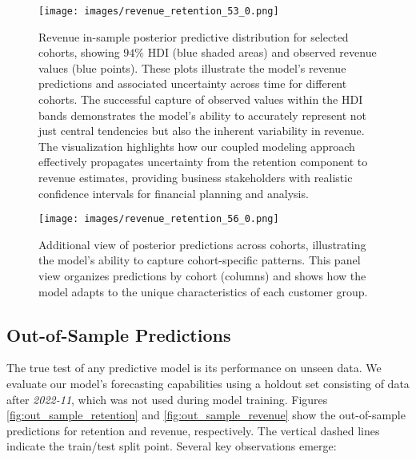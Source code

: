 \documentclass[11pt]{amsart}
\theoremstyle{definition}
\begin{document}
\begin{figure}
    \centering
    \texttt{[image: images/revenue\_retention\_53\_0.png]}
    \caption{Revenue in-sample posterior predictive distribution for selected cohorts, showing $94\%$ HDI (blue shaded areas)
        and observed revenue values (blue points). These plots illustrate the model's revenue predictions and associated
        uncertainty across time for different cohorts. The successful capture of observed values within the HDI bands
        demonstrates the model's ability to accurately represent not just central tendencies but also the inherent
        variability in revenue. The visualization highlights how our coupled modeling approach effectively propagates
        uncertainty from the retention component to revenue estimates, providing business stakeholders with realistic
        confidence intervals for financial planning and analysis.}
    \label{fig:in_sample_revenue}
\end{figure}

\begin{figure}
    \texttt{[image: images/revenue\_retention\_56\_0.png]}
    \caption{Additional view of posterior predictions across cohorts, illustrating the model's ability to capture
        cohort-specific patterns. This panel view organizes predictions by cohort (columns) and shows how the model
        adapts to the unique characteristics of each customer group.}
    \label{fig:additional_predictions}
\end{figure}

\subsection{Out-of-Sample Predictions}

The true test of any predictive model is its performance on unseen data. We evaluate our model's forecasting capabilities
using a holdout set consisting of data after {\em 2022-11}, which was not used during model training. Figures
\ref{fig:out_sample_retention} and \ref{fig:out_sample_revenue} show the out-of-sample predictions for retention and
revenue, respectively. The vertical dashed lines indicate the train/test split point. Several key observations emerge:
\end{document}
